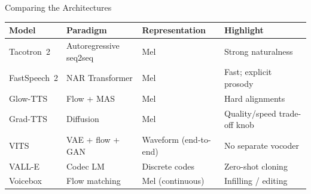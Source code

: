 \begin{frame}{Comparing the Architectures}
  \footnotesize
  \begin{tabular}{@{}llll@{}}
    \hline
    \textbf{Model} & \textbf{Paradigm} & \textbf{Representation} & \textbf{Highlight} \\
    \hline
    Tacotron~2 & Autoregressive seq2seq & Mel & Strong naturalness \\
    FastSpeech~2 & NAR Transformer & Mel & Fast; explicit prosody \\
    Glow-TTS & Flow + MAS & Mel & Hard alignments \\
    Grad-TTS & Diffusion & Mel & Quality/speed trade-off knob \\
    VITS & VAE + flow + GAN & Waveform (end-to-end) & No separate vocoder \\
    VALL-E & Codec LM & Discrete codes & Zero-shot cloning \\
    Voicebox & Flow matching & Mel (continuous) & Infilling / editing \\
    \hline
  \end{tabular}
\end{frame}
